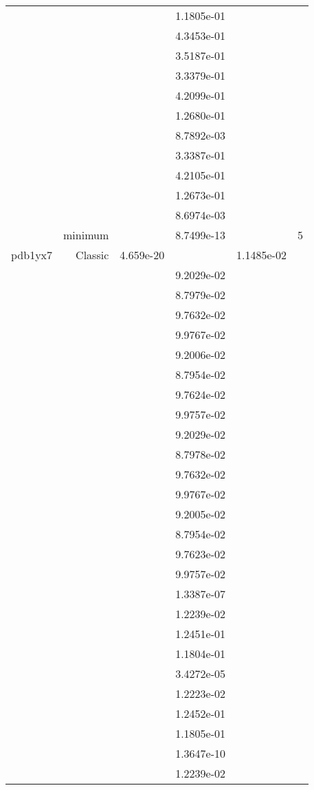 \begin{xltabular}{\textwidth}{r|rS[table-format=1.3e+2]S[table-format=1.4e+2]S[table-format=1.4e+2]S[table-format=-1.5]}
&  &  & 1.1805e-01 & & \\
&  &  & 4.3453e-01 & & \\
&  &  & 3.5187e-01 & & \\
&  &  & 3.3379e-01 & & \\
&  &  & 4.2099e-01 & & \\
&  &  & 1.2680e-01 & & \\
&  &  & 8.7892e-03 & & \\
&  &  & 3.3387e-01 & & \\
&  &  & 4.2105e-01 & & \\
&  &  & 1.2673e-01 & & \\
&  &  & 8.6974e-03 & & \\
& minimum &  & 8.7499e-13 & & 5 \\  \addlinespace
pdb1yx7 & Classic & 4.659e-20 &  & 1.1485e-02 & \\
&  &  & 9.2029e-02 & & \\
&  &  & 8.7979e-02 & & \\
&  &  & 9.7632e-02 & & \\
&  &  & 9.9767e-02 & & \\
&  &  & 9.2006e-02 & & \\
&  &  & 8.7954e-02 & & \\
&  &  & 9.7624e-02 & & \\
&  &  & 9.9757e-02 & & \\
&  &  & 9.2029e-02 & & \\
&  &  & 8.7978e-02 & & \\
&  &  & 9.7632e-02 & & \\
&  &  & 9.9767e-02 & & \\
&  &  & 9.2005e-02 & & \\
&  &  & 8.7954e-02 & & \\
&  &  & 9.7623e-02 & & \\
&  &  & 9.9757e-02 & & \\
&  &  & 1.3387e-07 & & \\
&  &  & 1.2239e-02 & & \\
&  &  & 1.2451e-01 & & \\
&  &  & 1.1804e-01 & & \\
&  &  & 3.4272e-05 & & \\
&  &  & 1.2223e-02 & & \\
&  &  & 1.2452e-01 & & \\
&  &  & 1.1805e-01 & & \\
&  &  & 1.3647e-10 & & \\
&  &  & 1.2239e-02 & & \\

\end{xltabular}
